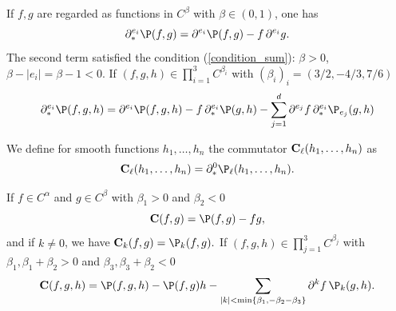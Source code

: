 \documentclass[11pt]{preprint}
\def\eqref#1{(\ref{#1})}
\newcommand{\bfC}{{\bf C}}
\begin{document}
	
	\begin{example}
		If $f,g$ are regarded as functions in $C^\beta$ with $\beta\in(0,1)$, one has
		$$
		\partial^{e_i}_*\P(f,g) = \partial^{e_i} \P(f,g) - f \, \partial^{e_i} g.
		$$
		The second term satisfied the condition \eqref{condition_sum}: $ \beta >  0 $, $ \beta-|e_i| = \beta-1 < 0 $.
		If $(f,g,h)\in \prod_{i=1}^3 C^{\beta_i} $ with $(\beta_i)_i = (3/2 , -4/3,7/6  ) $
		$$
		\partial_*^{e_i} \P(f,g,h) = \partial^{e_i} \P(f,g,h) - f \, \partial^{e_i}_*\P(g,h) - \sum_{j=1}^d\partial^{e_j}f \, \partial^{e_i}_*\P_{e_j}(g,h)
		$$
	\end{example}
	We define  for smooth functions $h_1,\dots,h_n$ the commutator $ \bfC_\ell(h_1,\dots,h_n) $ as 
	\begin{equation}\begin{split}\label{eqdef_corrector}
			\bfC_\ell(h_1,\dots,h_n) = \partial^{0}_* \P_\ell(h_1,\dots, h_n).
	\end{split}\end{equation}

\begin{example}
	If $f\in C^\alpha$ and $g\in C^\beta$ with $\beta_1>0$ and $\beta_2<0$
	$$
	\bfC (f,g) = \P(f,g) - f g,
	$$
	and if $k\ne 0$, we have 
	$
	\bfC_k(f,g) = \P_k(f,g).
	$
	If $(f,g,h)\in \prod_{j=1}^{3}C^{\beta_j}$ with $\beta_1,\beta_1+\beta_2>0$ and $\beta_3,\beta_3+\beta_2<0$
	$$
	\bfC(f,g,h) = \P(f,g,h) - \P(f,g)h - \sum_{|k|<\min\{\beta_1,-\beta_2-\beta_3\} } \partial^k f \, \P_k(g,h).
	$$
\end{example}
	
	

	
	
	
	

	
	
	
	
	
\end{document}
